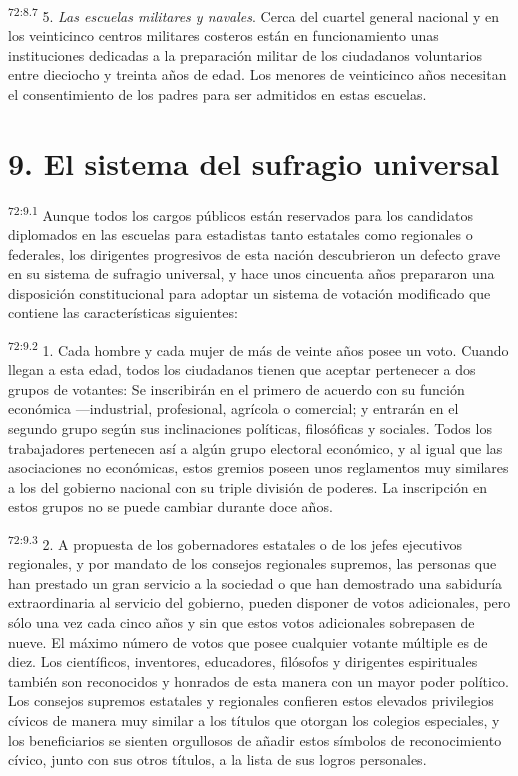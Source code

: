 \documentclass[twoside, 11pt]{book}
\begin{document}
\par
\textsuperscript{72:8.7} 5. \textit{Las escuelas militares y navales}. Cerca del cuartel general nacional y en los veinticinco centros militares costeros están en funcionamiento unas instituciones dedicadas a la preparación militar de los ciudadanos voluntarios entre dieciocho y treinta años de edad. Los menores de veinticinco años necesitan el consentimiento de los padres para ser admitidos en estas escuelas.

\section*{9. El sistema del sufragio universal}
\par
\textsuperscript{72:9.1} Aunque todos los cargos públicos están reservados para los candidatos diplomados en las escuelas para estadistas tanto estatales como regionales o federales, los dirigentes progresivos de esta nación descubrieron un defecto grave en su sistema de sufragio universal, y hace unos cincuenta años prepararon una disposición constitucional para adoptar un sistema de votación modificado que contiene las características siguientes:

\par
\textsuperscript{72:9.2} 1. Cada hombre y cada mujer de más de veinte años posee un voto. Cuando llegan a esta edad, todos los ciudadanos tienen que aceptar pertenecer a dos grupos de votantes: Se inscribirán en el primero de acuerdo con su función económica ---industrial, profesional, agrícola o comercial; y entrarán en el segundo grupo según sus inclinaciones políticas, filosóficas y sociales. Todos los trabajadores pertenecen así a algún grupo electoral económico, y al igual que las asociaciones no económicas, estos gremios poseen unos reglamentos muy similares a los del gobierno nacional con su triple división de poderes. La inscripción en estos grupos no se puede cambiar durante doce años.

\par
\textsuperscript{72:9.3} 2. A propuesta de los gobernadores estatales o de los jefes ejecutivos regionales, y por mandato de los consejos regionales supremos, las personas que han prestado un gran servicio a la sociedad o que han demostrado una sabiduría extraordinaria al servicio del gobierno, pueden disponer de votos adicionales, pero sólo una vez cada cinco años y sin que estos votos adicionales sobrepasen de nueve. El máximo número de votos que posee cualquier votante múltiple es de diez. Los científicos, inventores, educadores, filósofos y dirigentes espirituales también son reconocidos y honrados de esta manera con un mayor poder político. Los consejos supremos estatales y regionales confieren estos elevados privilegios cívicos de manera muy similar a los títulos que otorgan los colegios especiales, y los beneficiarios se sienten orgullosos de añadir estos símbolos de reconocimiento cívico, junto con sus otros títulos, a la lista de sus logros personales.
\end{document}
